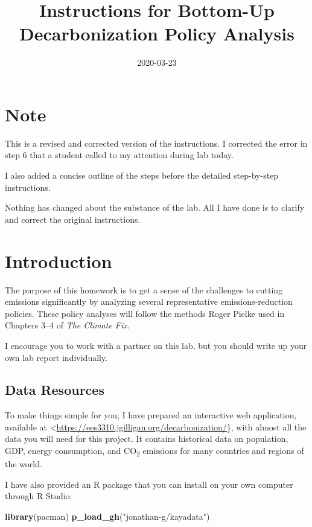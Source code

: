 \documentclass[
]{article}
\title{Instructions for Bottom-Up Decarbonization Policy Analysis}
\author{}
\date{\vspace{-2.5em}2020-03-23}
\newenvironment{Shaded}{\begin{snugshade}}{\end{snugshade}}
\newcommand{\KeywordTok}[1]{\textcolor[rgb]{0.13,0.29,0.53}{\textbf{#1}}}
\newcommand{\NormalTok}[1]{#1}
\newcommand{\StringTok}[1]{\textcolor[rgb]{0.31,0.60,0.02}{#1}}
\begin{document}
\maketitle

{
\setcounter{tocdepth}{2}
\tableofcontents
}
\hypertarget{note}{%
\section{Note}\label{note}}

This is a revised and corrected version of the instructions. I corrected
the error in step 6 that a student called to my attention during lab
today.

I also added a concise outline of the steps before the detailed
step-by-step instructions.

Nothing has changed about the substance of the lab. All I have done is
to clarify and correct the original instructions.

\hypertarget{introduction}{%
\section{Introduction}\label{introduction}}

The purpose of this homework is to get a sense of the challenges to
cutting emissions significantly by analyzing several representative
emissions-reduction policies. These policy analyses will follow the
methods Roger Pielke used in Chapters 3--4 of \emph{The Climate Fix}.

I encourage you to work with a partner on this lab, but you should write
up your own lab report individually.

\hypertarget{data-resources}{%
\subsection{Data Resources}\label{data-resources}}

To make things simple for you, I have prepared an interactive web
application, available at
\textless{}\url{https://ees3310.jgilligan.org/decarbonization/}\}, with
almost all the data you will need for this project. It contains
historical data on population, GDP, energy consumption, and
CO\textsubscript{2} emissions for many countries and regions of the
world.

I have also provided an R package that you can install on your own
computer through R Studio:

\begin{Shaded}
\begin{Highlighting}[]
\KeywordTok{library}\NormalTok{(pacman)}
\KeywordTok{p\_load\_gh}\NormalTok{(}\StringTok{"jonathan{-}g/kayadata"}\NormalTok{)}
\end{Highlighting}
\end{Shaded}
\end{document}
